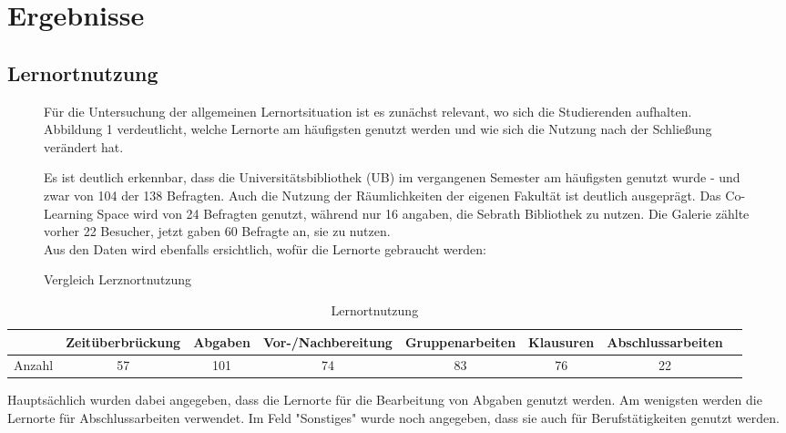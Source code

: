 \documentclass[11pt, a4paper]{article}
\begin{document}
\newpage
\section{Ergebnisse}
\subsection{Lernortnutzung}
\begin{figure}[h]
Für die Untersuchung der allgemeinen Lernortsituation ist es zunächst relevant, wo sich die Studierenden aufhalten. Abbildung 1 verdeutlicht, welche Lernorte am häufigsten genutzt werden und wie sich die Nutzung nach der Schließung verändert hat.

 
 \vspace{-0.62cm}
 \caption{Vergleich Lerznortnutzung }
 \vspace{0.5cm}

Es ist deutlich erkennbar, dass die Universitätsbibliothek (UB) im vergangenen Semester am häufigsten genutzt wurde - und zwar von 104 der 138 Befragten. Auch die Nutzung der Räumlichkeiten der eigenen Fakultät ist deutlich ausgeprägt. Das Co-Learning Space wird von 24  Befragten genutzt, während nur 16 angaben, die Sebrath Bibliothek zu nutzen. 
Die Galerie zählte vorher 22 Besucher, jetzt gaben 60 Befragte an, sie zu nutzen.\\

Aus den Daten wird ebenfalls ersichtlich, wofür die Lernorte gebraucht werden:



\end{figure}
\begin{table}[h]
	\begin{tabular}{c|ccccccc}
		& Zeitüberbrückung & Abgaben & Vor-/Nachbereitung & Gruppenarbeiten & Klausuren & Abschlussarbeiten \\ \hline
		Anzahl & 57            & 101             & 74                          & 83                     & 76                 & 22                      
	\end{tabular}
		\caption{Lernortnutzung}
\end{table}

Hauptsächlich wurden dabei angegeben, dass die Lernorte für die Bearbeitung von Abgaben genutzt werden. Am wenigsten werden die Lernorte für Abschlussarbeiten verwendet. Im Feld "Sonstiges" wurde noch angegeben, dass sie auch für Berufstätigkeiten genutzt werden.
\end{document}
